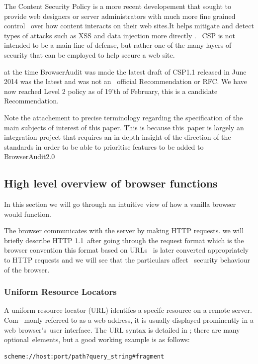\documentclass[a4paper,12pt]{paper}
\begin{document}
The Content Security Policy is a more recent developement that sought to provide web designers or server administrators with much more fine grained control \
over how content interacts on their web sites.It helps mitigate and detect types of attacks such as XSS and data injection more directly . \
CSP is not intended to be a main line of defense, but rather one of the many layers of security that can be employed to help secure a web site.\

at the time BrowserAudit was made the latest draft of CSP1.1 released in June 2014 was the latest and was not an \
official Recommendation or RFC. We have now reached Level 2 policy as of 19'th of February,\cite{csp} this is a candidate Recommendation.\

Note the attachement to precise terminology regarding the specification of the main subjects of interest of this paper. This is because this\ 
paper is largely an integration project that requires an in-depth insight of the direction of the standards in order to be able to prioritise features to be added to BrowserAudit2.0\

\subsection{High level overview of browser functions}

In this section we will go through an intuitive view of how a vanilla browser would function.\

The browser communicates with the server by making HTTP requests. we will briefly describe HTTP 1.1\
after going through the request format which is the browser convention this format based on URLs \
is later converted appropriately to HTTP requests and we will see that the particulars affect \
security behaviour of the browser.\

\subsubsection{Uniform Resource Locators}

A uniform resource locator (URL) identifes a specifc resource on a remote server. Com-\
monly referred to as a web address, it is usually displayed prominently in a web browser's\
user interface. The URL syntax is detailed in \cite{URL}; there are many optional\
elements, but a good working example is as follows:\\

\begin{verbatim}
scheme://host:port/path?query_string#fragment
\end{verbatim}
\end{document}

